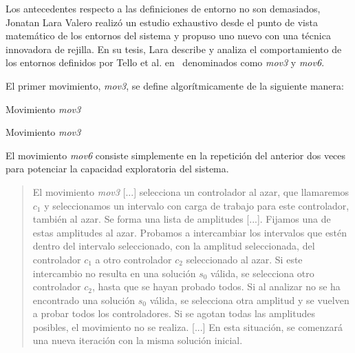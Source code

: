 Los antecedentes respecto a las definiciones de entorno no son demasiados, Jonatan Lara Valero realizó un estudio exhaustivo desde el punto de vista matemático de los entornos del sistema \legacy{} y propuso uno nuevo con una técnica innovadora de rejilla. En su tesis, Lara describe y analiza el comportamiento de los entornos definidos por Tello et al. en~\cite{articulo1} denominados como \textit{mov3} y \textit{mov6}. 

El primer movimiento, \textit{mov3}, se define algorítmicamente de la siguiente manera:

\begin{algorithm}[h]
	\caption{Movimiento \textit{mov3}}
	\label{algoritmo:entorno-mov3}
	
	\DontPrintSemicolon
	\LinesNumbered
	\bigskip
	
	
\end{algorithm}

\begin{algorithm}[h]
	\caption{Movimiento \textit{mov3}}
	\label{algoritmo:entorno-mov3}
	
	\DontPrintSemicolon
	\LinesNumbered
	\bigskip
	
	
\end{algorithm}

El movimiento \textit{mov6} consiste simplemente en la repetición del anterior dos veces para potenciar la capacidad exploratoria del sistema.

\begin{quotation}
	El movimiento \textit{mov3} [...] selecciona un controlador al azar, que llamaremos $c_1$ y seleccionamos un
	intervalo con carga	de trabajo para este controlador, también al azar. Se forma una lista de amplitudes [...]. Fijamos una de estas amplitudes al azar. Probamos a intercambiar los intervalos que estén dentro del intervalo
	seleccionado, con la amplitud seleccionada, del controlador $c_1$ a otro controlador $c_2$ seleccionado al azar. Si este intercambio no resulta en una solución $s_0$ válida, se selecciona
	otro controlador $c_2$, hasta que se hayan probado todos. Si al analizar no se ha
	encontrado una solución $s_0$ válida, se selecciona otra amplitud y se vuelven a probar
	todos los controladores. Si se agotan todas las amplitudes posibles, el movimiento
	no se realiza. [...] En esta situación, se comenzará una nueva iteración con la misma solución inicial.
	
\end{quotation}

